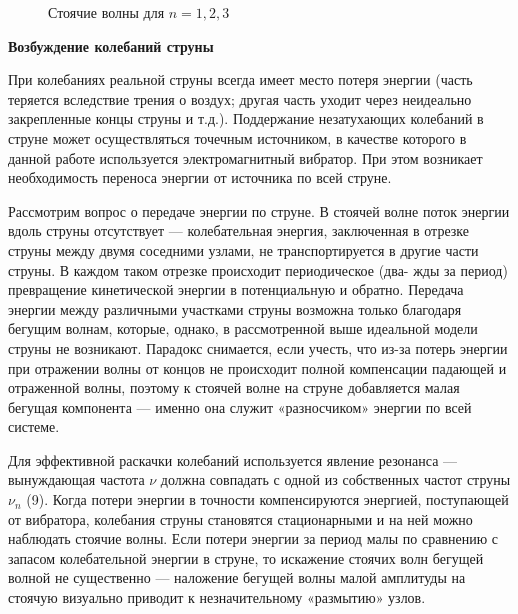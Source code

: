 \documentclass[14pt]{article}
\begin{document}
\begin{figure}[h!]
	\caption{Стоячие волны для $n = 1, 2, 3$}
	\label{fig:image}
\end{figure}

\vspace{1cm}
\textbf{Возбуждение колебаний струны}

При колебаниях реальной струны всегда имеет место потеря энергии (часть теряется вследствие трения о воздух; другая часть уходит через неидеально закрепленные концы струны и т.д.). Поддержание незатухающих колебаний в струне может осуществляться точечным источником, в качестве которого в данной работе используется электромагнитный вибратор. При этом возникает необходимость переноса энергии от источника по всей струне.

Рассмотрим вопрос о передаче энергии по струне. В стоячей волне поток энергии вдоль струны отсутствует — колебательная энергия, заключенная
в отрезке струны между двумя соседними узлами, не транспортируется в другие части струны. В каждом таком отрезке происходит периодическое (два-
жды за период) превращение кинетической энергии в потенциальную и обратно. Передача энергии между различными участками струны возможна только благодаря бегущим волнам, которые, однако, в рассмотренной выше идеальной модели струны не возникают. Парадокс снимается, если учесть, что из-за потерь энергии при отражении волны от концов не происходит полной компенсации падающей и отраженной волны, поэтому к стоячей волне на струне добавляется малая бегущая компонента — именно она служит «разносчиком» энергии по всей системе. 

Для эффективной раскачки колебаний используется явление резонанса --- вынуждающая частота $\nu$ должна совпадать с одной из собственных частот струны $\nu_n$ (9). Когда потери энергии в точности компенсируются энергией, поступающей от вибратора, колебания струны становятся стационарными и на ней можно наблюдать стоячие волны. Если потери энергии за период малы по сравнению с запасом колебательной энергии в струне, то искажение стоячих волн бегущей волной не существенно --- наложение бегущей волны малой амплитуды на стоячую визуально приводит к незначительному «размытию» узлов.
\end{document}
